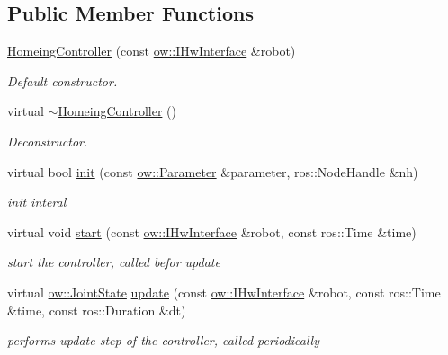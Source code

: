 \subsection*{Public Member Functions}
\begin{DoxyCompactItemize}
\item 
\hyperlink{classow__controller_1_1HomeingController_a21bed77590bf3c6998c2452e6869b3f6}{Homeing\+Controller} (const \hyperlink{classow_1_1IHwInterface}{ow\+::\+I\+Hw\+Interface} \&robot)
\begin{DoxyCompactList}\small\item\em Default constructor. \end{DoxyCompactList}\item 
virtual \hyperlink{classow__controller_1_1HomeingController_a690c588438cf3abd8c898fa7600113e7}{$\sim$\+Homeing\+Controller} ()\hypertarget{classow__controller_1_1HomeingController_a690c588438cf3abd8c898fa7600113e7}{}\label{classow__controller_1_1HomeingController_a690c588438cf3abd8c898fa7600113e7}

\begin{DoxyCompactList}\small\item\em Deconstructor. \end{DoxyCompactList}\item 
virtual bool \hyperlink{classow__controller_1_1HomeingController_aa9841489fbf7515ed7f26714eeba9f96}{init} (const \hyperlink{classow_1_1Parameter}{ow\+::\+Parameter} \&parameter, ros\+::\+Node\+Handle \&nh)
\begin{DoxyCompactList}\small\item\em init interal \end{DoxyCompactList}\item 
virtual void \hyperlink{classow__controller_1_1HomeingController_a7ef74fa759dd3ceab2913d31c42fa90e}{start} (const \hyperlink{classow_1_1IHwInterface}{ow\+::\+I\+Hw\+Interface} \&robot, const ros\+::\+Time \&time)
\begin{DoxyCompactList}\small\item\em start the controller, called befor update \end{DoxyCompactList}\item 
virtual \hyperlink{classow__core_1_1JointState}{ow\+::\+Joint\+State} \hyperlink{classow__controller_1_1HomeingController_ab703611f1f341457b3944a29c5a435d9}{update} (const \hyperlink{classow_1_1IHwInterface}{ow\+::\+I\+Hw\+Interface} \&robot, const ros\+::\+Time \&time, const ros\+::\+Duration \&dt)
\begin{DoxyCompactList}\small\item\em performs update step of the controller, called periodically \end{DoxyCompactList}\end{DoxyCompactItemize}
